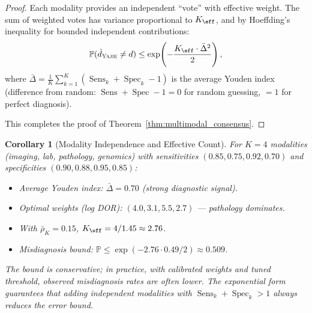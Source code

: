 \documentclass[11pt,a4paper]{article}
\newtheorem{corollary}[theorem]{Corollary}
\theoremstyle{definition}
\newcommand{\Yajie}{\textsc{Yajie}}
\DeclareMathOperator{\Sens}{Sens}
\DeclareMathOperator{\Spec}{Spec}
\newcommand{\Pbb}{\mathbb{P}}
\newcommand{\disease}{d}                       %
\newcommand{\diagnosis}{\hat{d}}               %
\begin{document}
\begin{proof}
Each modality provides an independent ``vote'' with effective weight.
The sum of weighted votes has variance proportional to $K_{\eff}$, and
by Hoeffding's inequality for bounded independent contributions:
\begin{equation}
    \Pbb(\diagnosis_{\Yajie} \neq \disease) \le \exp\!\left(-\frac{K_{\eff} \cdot \bar{\Delta}^2}{2}\right),
\end{equation}
where $\bar{\Delta} = \frac{1}{K}\sum_{k=1}^{K} (\Sens_k + \Spec_k - 1)$ is
the average Youden index (difference from random: $\Sens + \Spec - 1 = 0$
for random guessing, $= 1$ for perfect diagnosis).

This completes the proof of Theorem~\ref{thm:multimodal_consensus}.
\end{proof}

\begin{corollary}[Modality Independence and Effective Count]
\label{cor:modality_eff}
For $K=4$ modalities (imaging, lab, pathology, genomics) with sensitivities
$(0.85, 0.75, 0.92, 0.70)$ and specificities $(0.90, 0.88, 0.95, 0.85)$:
\begin{itemize}[nosep]
    \item Average Youden index: $\bar{\Delta} = 0.70$ (strong diagnostic signal).
    \item Optimal weights (log DOR): $(4.0, 3.1, 5.5, 2.7)$ --- pathology dominates.
    \item With $\bar{\rho}_K = 0.15$, $K_{\eff} = 4/1.45 \approx 2.76$.
    \item Misdiagnosis bound: $\Pbb \le \exp(-2.76 \cdot 0.49 / 2) \approx 0.509$.
\end{itemize}
The bound is conservative; in practice, with calibrated weights and tuned
threshold, observed misdiagnosis rates are often lower. The exponential
form guarantees that adding independent modalities with $\Sens_k + \Spec_k > 1$
always reduces the error bound.
\end{corollary}
\end{document}
